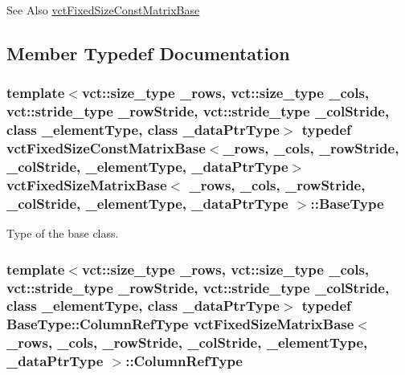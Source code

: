 \begin{DoxySeeAlso}{See Also}
\hyperlink{classvct_fixed_size_const_matrix_base}{vct\-Fixed\-Size\-Const\-Matrix\-Base} 
\end{DoxySeeAlso}


\subsection{Member Typedef Documentation}
\hypertarget{classvct_fixed_size_matrix_base_af750de762d865940c9eba155b2e87b9c}{
\subsubsection[{Base\-Type}]{\setlength{\rightskip}{0pt plus 5cm}template$<$vct\-::size\-\_\-type \-\_\-rows, vct\-::size\-\_\-type \-\_\-cols, vct\-::stride\-\_\-type \-\_\-row\-Stride, vct\-::stride\-\_\-type \-\_\-col\-Stride, class \-\_\-element\-Type, class \-\_\-data\-Ptr\-Type$>$ typedef {\bf vct\-Fixed\-Size\-Const\-Matrix\-Base}$<$\-\_\-rows, \-\_\-cols, \-\_\-row\-Stride, \-\_\-col\-Stride, \-\_\-element\-Type, \-\_\-data\-Ptr\-Type$>$ {\bf vct\-Fixed\-Size\-Matrix\-Base}$<$ \-\_\-rows, \-\_\-cols, \-\_\-row\-Stride, \-\_\-col\-Stride, \-\_\-element\-Type, \-\_\-data\-Ptr\-Type $>$\-::{\bf Base\-Type}}}\label{classvct_fixed_size_matrix_base_af750de762d865940c9eba155b2e87b9c}
Type of the base class. \hypertarget{classvct_fixed_size_matrix_base_a59c0bb73e3e0a4d1daea3a017eceaac7}{
\subsubsection[{Column\-Ref\-Type}]{\setlength{\rightskip}{0pt plus 5cm}template$<$vct\-::size\-\_\-type \-\_\-rows, vct\-::size\-\_\-type \-\_\-cols, vct\-::stride\-\_\-type \-\_\-row\-Stride, vct\-::stride\-\_\-type \-\_\-col\-Stride, class \-\_\-element\-Type, class \-\_\-data\-Ptr\-Type$>$ typedef {\bf Base\-Type\-::\-Column\-Ref\-Type} {\bf vct\-Fixed\-Size\-Matrix\-Base}$<$ \-\_\-rows, \-\_\-cols, \-\_\-row\-Stride, \-\_\-col\-Stride, \-\_\-element\-Type, \-\_\-data\-Ptr\-Type $>$\-::{\bf Column\-Ref\-Type}}}\label{classvct_fixed_size_matrix_base_a59c0bb73e3e0a4d1daea3a017eceaac7}
